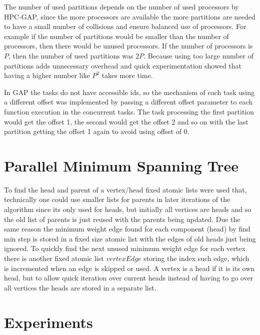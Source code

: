 \documentclass{report}
\theoremstyle{plain}
\theoremstyle{definition}
\theoremstyle{remark}
\begin{document}
The number of used partitions depends on the number of used processors by HPC-GAP, since the more processors are available the more partitions are needed to have a small number of collisions and ensure balanced use of processors. For example if the number of partitions would be smaller than the number of processors, then there would be unused processors. If the number of processors is $P$, then the number of used partitions was $2P$. Because using too large number of partitions adds unnecessary overhead and quick experimentation showed that having a higher number like $P^2$ takes more time.

In GAP the tasks do not have accessible ids, so the mechanism of each task using a different offset was implemented by passing a different offset parameter to each function execution in the concurrent tasks. The task processing the first partition would get the offset 1, the second would get the offset 2 and so on with the last partition getting the offset 1 again to avoid using offset of 0.

\section{Parallel Minimum Spanning Tree}

To find the head and parent of a vertex/head fixed atomic lists were used that, technically one could use smaller lists for parents in later iterations of the algorithm since its only used for heads, but initially all vertices are heads and so the old list of parents is just reused with the parents being updated. Due the same reason the minimum weight edge found for each component (head) by find min step is stored in a fixed size atomic list with the edges of old heads just being ignored. To quickly find the next unused minimum weight edge for each vertex there is another fixed atomic list $vertexEdge$ storing the index such edge, which is incremented when an edge is skipped or used. A vertex is a head if it is its own head, but to allow quick iteration over current heads instead of having to go over all vertices the heads are stored in a separate list.

\section{Experiments}
\end{document}

